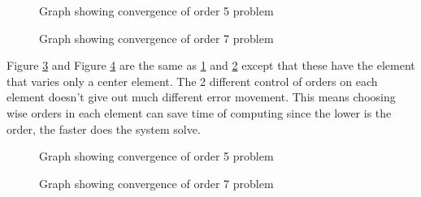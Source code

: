 \begin{figure}[h]
\begin{center}
\caption{\label{crvconvf5}Graph showing convergence of order 5
problem}
\end{center}
\end{figure}

\begin{figure}[h]
\begin{center}
\caption{\label{crvconvf6}Graph showing convergence of order 7
problem}
\end{center}
\end{figure}

Figure \ref{crvconvf7} and Figure \ref{crvconvf8} are the same as
\ref{crvconvf5} and \ref{crvconvf6} except that these have the
element that varies only a center element. The 2 different control
of orders on each element doesn't give out much different error
movement. This means choosing wise orders in each element can save
time of computing since the lower is the order, the faster does
the system solve.

\begin{figure}[h]
\begin{center}
\caption{\label{crvconvf7}Graph showing convergence of order 5
problem}
\end{center}
\end{figure}

\begin{figure}[h]
\begin{center}
\caption{\label{crvconvf8}Graph showing convergence of order 7
problem}
\end{center}
\end{figure}
